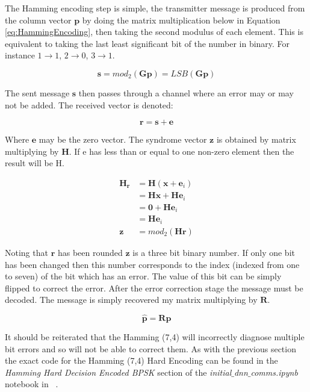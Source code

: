 \documentclass[12pt,onecolumn,letterpaper]{article}
\newcommand{\code}{\textit}
\begin{document}
The Hamming encoding step is simple, the transmitter message is produced from the column vector $\mathbf{p}$ by doing the matrix multiplication below in Equation \ref{eq:HammingEncoding}, then taking the second modulus of each element. This is equivalent to taking the last least significant bit of the number in binary. For instance $1 \rightarrow 1$, $2 \rightarrow 0$, $3 \rightarrow 1$.

\begin{equation}
   \mathbf{s} = mod_2(\mathbf{Gp}) = LSB(\mathbf{Gp})
   \label{eq:HammingEncoding}
\end{equation}

The sent message $\mathbf{s}$ then passes through a channel where an error may or may not be added. The received vector is denoted:

\begin{equation}
   \mathbf{r} = \mathbf{s} + \mathbf{e}
\end{equation}

Where $\mathbf{e}$ may be the zero vector. The syndrome vector $\mathbf{z}$ is obtained by matrix multiplying by $\mathbf{H}$. If e has less than or equal to one non-zero element then the result will be H.

\begin{align}
   \mathbf{H_r} &= \mathbf{H}(\mathbf{x} + \mathbf{e}_i) \\
   &= \mathbf{Hx} + \mathbf{He}_i \\
   &= \mathbf{0} + \mathbf{He}_i \\
   &= \mathbf{He}_i \\
   \mathbf{z} &= mod_2\left(\mathbf{Hr}\right)
\end{align}

Noting that $\mathbf{r}$ has been rounded $\mathbf{z}$ is a three bit binary number. If only one bit has been changed then this number corresponds to the index (indexed from one to seven) of the bit which has an error. The value of this bit can be simply flipped to correct the error. After the error correction stage the message must be decoded. The message is simply recovered my matrix multiplying by $\mathbf{R}$.

\begin{equation}
   \hat{\mathbf{p}} = \mathbf{Rp}
\end{equation}

It should be reiterated that the Hamming (7,4) will incorrectly diagnose multiple bit errors and so will not be able to correct them. As with the previous section the exact code for the Hamming (7,4) Hard Encoding can be found in the \textit{Hamming Hard Decision Encoded BPSK} section of the \code{initial$\_$dnn$\_$comms.ipynb} notebook in ~\cite{AwGithub}.
\end{document}
